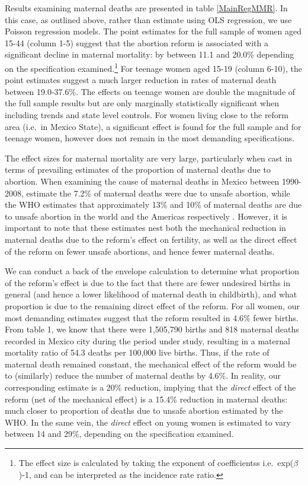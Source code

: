 \documentclass[a4paper, 11pt]{article}
\begin{document}
\begin{spacing}{2}
Results examining maternal deaths are presented in table \ref{MainRegMMR}. In this case, as outlined above, rather than estimate using OLS regression, we use Poisson regression models. The point estimates for the full sample of women aged 15-44 (column 1-5) suggest that the abortion reform is associated with a significant decline in maternal mortality: by between 11.1 and 20.0\% depending on the specification examined.\footnote{The effect size is calculated by taking the exponent of coefficientss i.e.\ exp($\beta$)-1, and can be interpreted as the incidence rate ratio.} For teenage women aged 15-19 (column 6-10), the point estimates suggest a much larger reduction in rates of maternal death between 19.0-37.6\%. The effects on teenage women are double the magnitude of the full sample results but are only marginally statistically significant when including trends and state level controls. For women living close to the reform area (i.e.\ in Mexico State), a significant effect is found for the full sample and for teenage women, however does not remain in the most demanding specifications.

The effect sizes for maternal mortality are very large, particularly when cast in terms of prevailing estimates of the proportion of maternal deaths due to abortion.  When examining the cause of maternal deaths in Mexico between 1990-2008, \citet{Schiavonetal2012} estimate the 7.2\% of maternal deaths were due to unsafe abortion, while the WHO estimates that approximately 13\% and 10\% of maternal deaths are due to unsafe abortion in the world and the Americas respectively \citep{WHO2011}.  However, it is important to note that these estimates nest both the mechanical reduction in maternal deaths due to the reform's effect on fertility, as well as the direct effect of the reform on fewer unsafe abortions, and hence fewer maternal deaths.

We can conduct a back of the envelope calculation to determine what proportion of the reform's effect is due to the fact that there are fewer undesired births in general (and hence a lower likelihood of maternal death in childbirth), and what proportion is due to the remaining direct effect of the reform.  For all women, our most demanding estimates suggest that the reform resulted in 4.6\% fewer births.  From table 1, we know that there were 1,505,790 births and 818 maternal deaths recorded in Mexico city during the period under study, resulting in a maternal mortality ratio of 54.3 deaths per 100,000 live births.  Thus, if the rate of maternal death remained constant, the mechanical effect of the reform would be to (similarly) reduce the number of maternal deaths by 4.6\%.  In reality, our corresponding estimate is a 20\% reduction, implying that the \emph{direct} effect of the reform (net of the mechanical effect) is a 15.4\% reduction in maternal deaths: much closer to proportion of deaths due to unsafe abortion estimated by the WHO.  In the same vein, the \emph{direct} effect on young women is estimated to vary between 14 and 29\%, depending on the specification examined.


\end{spacing}
\end{document}
